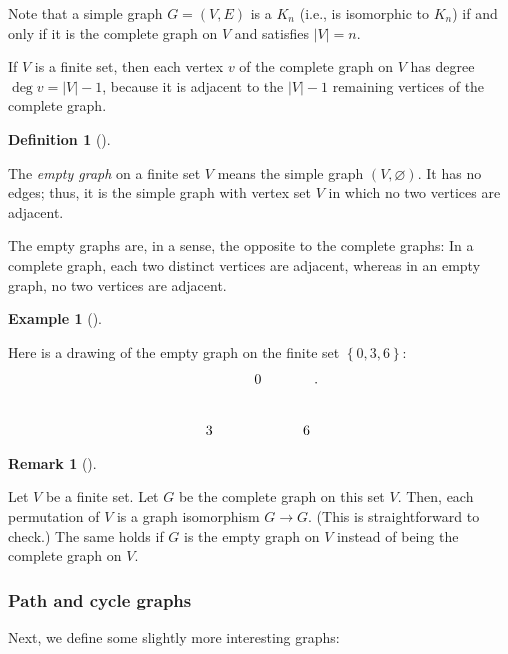 \documentclass[numbers=enddot,12pt,final,onecolumn,notitlepage]{scrartcl}%
\theoremstyle{definition}
\newtheorem{defi}[theo]{Definition}
\newenvironment{definition}[1][]
{\begin{defi}[#1]\begin{leftbar}}
{\end{leftbar}\end{defi}}
\newtheorem{remk}[theo]{Remark}
\newenvironment{remark}[1][]
{\begin{remk}[#1]\begin{leftbar}}
{\end{leftbar}\end{remk}}
\newtheorem{exam}[theo]{Example}
\newenvironment{example}[1][]
{\begin{exam}[#1]\begin{leftbar}}
{\end{leftbar}\end{exam}}
\newcommand{\set}[1]{\left\{ #1 \right\}}
\newcommand{\abs}[1]{\left| #1 \right|}
\newcommand{\tup}[1]{\left( #1 \right)}
\begin{document}
Note that a simple graph $G = \tup{V, E}$ is a $K_n$ (i.e., is
isomorphic to $K_n$) if and only if it is the complete graph on $V$
and satisfies $\abs{V} = n$.

If $V$ is a finite set, then each vertex $v$ of the complete graph on
$V$ has degree $\deg v = \abs{V}-1$, because it is adjacent to the
$\abs{V}-1$ remaining vertices of the complete graph.

\begin{definition} \label{def.intro.empty-graph}
The \textit{empty graph} on a finite set $V$ means
the simple graph $\tup{V, \varnothing}$. It has no edges; thus, it is
the simple graph with vertex set $V$ in which no two vertices are
adjacent.
\end{definition}

The empty graphs are, in a sense, the opposite to the complete graphs:
In a complete graph, each two distinct vertices are adjacent, whereas
in an empty graph, no two vertices are adjacent.

\begin{example}
Here is a drawing of the empty graph on the finite set
$\set{0, 3, 6}$:
\begin{align*}
\xymatrix{
& 0 \\
3 & & 6
} .
\end{align*}
\end{example}


\begin{remark}
Let $V$ be a finite set. Let $G$ be the complete graph on this set
$V$. Then, each permutation of $V$ is a graph isomorphism $G \to G$.
(This is straightforward to check.) The same holds if $G$ is the
empty graph on $V$ instead of being the complete graph on $V$.
\end{remark}

\subsubsection{Path and cycle graphs}

Next, we define some slightly more interesting graphs:
\end{document}

